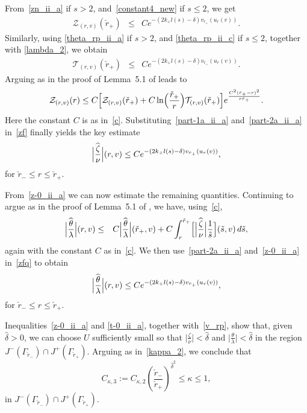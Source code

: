 \documentclass[a4paper,11pt,oneside,reqno]{amsart}
\newcommand{\s}{s}
\newcommand{\kk}{k_+}
\newcommand{\cal}{\mathcal}
\newcommand{\ckrm}{\check r_-}
\newcommand{\ckrp}{\check r_+}
\newcommand{\hatz}{\widehat{\frac{\zeta}{\nu}}}
\begin{document}
From~\eqref{zn_ii_a} if $\s>2$, and~\eqref{constant4_new}
if $\s\leq 2$, we get
\begin{eqnarray}
\label{part-1a_ii_a}
{\cal Z}_{(r,v)}(\ckrp)&\leq& 
Ce^{-(2\kk l(s)-\delta)v_{\ckrp}(u_r(v))}.
\end{eqnarray}
Similarly, using \eqref{theta_rp_ii_a} if $\s>2$, 
and \eqref{theta_rp_ii_c} if $\s \leq 2$, together with \eqref{lambda_2}, we obtain
\begin{eqnarray}
\label{part-2a_ii_a}
{\cal T}_{(r,v)}(\ckrp)&\leq& C
e^{-(2\kk l(s)-\delta)v_{\ckrp}(u_r(v))}.
\end{eqnarray}
Arguing as in the proof of Lemma~5.1 of \cite{relIst2} leads to
\begin{equation}\label{zf}
{\cal Z}_{(r,v)}(r)\leq C\Bigl[{\cal Z}_{(r,v)}(\ckrp)+C\ln\Bigl(\frac{\ckrp}{r}\Bigr){\cal T}_{(r,v)}(\ckrp)\Bigr]e^{\frac{C^2(\ckrp-r)^2}{r\ckrp}}.
\end{equation}
Here the constant $C$ is as in~\eqref{c}.
Substituting~\eqref{part-1a_ii_a} and~\eqref{part-2a_ii_a} in~\eqref{zf} finally yields the key estimate
\begin{equation}\label{z-0_ii_a}
\Bigl|\hatz\Bigr|(r,v)\leq 
Ce^{-(2\kk l(s)-\delta)v_{\ckrp}(u_r(v))},
\end{equation}
for $\ckrm\leq r\leq\ckrp$.

From~\eqref{z-0_ii_a} we can now estimate the remaining quantities. Continuing to argue as in the proof of Lemma~5.1 of \cite{relIst2}, we have, using~\eqref{c},
\begin{eqnarray}
\Bigl|\widehat{\frac\theta\lambda}\Bigr|(r,v)&\leq&C\Bigl|\widehat{\frac\theta\lambda}\Bigr|(\ckrp,v)
+C\int_{r}^{\ckrp}\Bigl[\Bigl|\hatz\Bigr|\frac 1 {\tilde s}\Bigr](\tilde s,v)\,d\tilde s,\label{zfq}
\end{eqnarray}
again with the constant $C$ as in~\eqref{c}.
We then use~\eqref{part-2a_ii_a} and~\eqref{z-0_ii_a} in~\eqref{zfq}
to obtain
\begin{equation}\label{t-0_ii_a}
\Bigl|\widehat{\frac\theta\lambda}\Bigr|(r,v)\leq 
Ce^{-(2\kk l(s)-\delta)v_{\ckrp}(u_r(v))},
\end{equation}
for $\ckrm\leq r\leq\ckrp$.

Inequalities~\eqref{z-0_ii_a} and \eqref{t-0_ii_a},
together with~\eqref{v_rp}, show that, given $\hat{\delta}>0$, we can choose
$U$ sufficiently small so that $\bigl|\frac{\zeta}{\nu}\bigr|<\hat{\delta}$ and $\bigl|\frac{\theta}{\lambda}\bigr|<\hat{\delta}$
in the region $J^-(\Gamma_{\ckrm})\cap J^+(\Gamma_{\ckrp})$. Arguing as 
in~\eqref{kappa_2}, we conclude that
\begin{equation}\label{kappa_3}
C_{\kappa,3}:=C_{\kappa,2}\left(\frac{\ckrm}{\ckrp}\right)^{\hat{\delta}^2}\leq\kappa\leq 1,
\end{equation}
in $J^-(\Gamma_{\ckrm})\cap J^+(\Gamma_{\ckrp})$.
\end{document}
